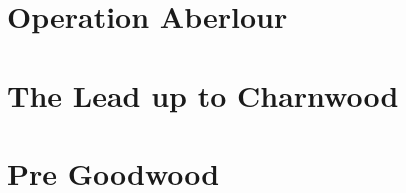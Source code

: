 \documentclass[noraggedright]{turabian-researchpaper}
\begin{document}
\section{Operation Aberlour}

\section{} %


\section{The Lead up to Charnwood}












\section{Pre Goodwood}
\end{document}
